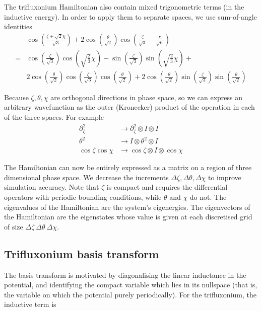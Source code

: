 \documentclass[11pt]{article}
\begin{document}
The trifluxonium Hamiltonian also contain mixed trigonometric terms (in the inductive energy). In order to apply them to separate spaces, we use sum-of-angle identities
\begin{align}
& \cos{\left(\frac{\zeta + \sqrt{2} \chi}{\sqrt{3}}\right)} + 2 \cos{\left(\frac{\theta}{\sqrt{2}}\right)} \cos{\left(\frac{\zeta}{\sqrt{3}} - \frac{\chi}{\sqrt{6}}\right)} \\
= 
& \cos{\left(\frac{\zeta}{\sqrt{3}}\right)} \cos{\left(\sqrt{\frac{2}{3}}\chi\right)} - \sin{\left(\frac{\zeta}{\sqrt{3}}\right)} \sin{\left(\sqrt{\frac{2}{3}}\chi\right)} + \\
& 2 \cos{\left(\frac{\theta}{\sqrt{2}}\right)} \cos{\left(\frac{\zeta}{\sqrt{3}}\right)} \cos{\left(\frac{\theta}{\sqrt{2}}\right)} + 2 \cos{\left(\frac{\theta}{\sqrt{2}}\right)} \sin{\left(\frac{\zeta}{\sqrt{3}}\right)} \sin{\left(\frac{\theta}{\sqrt{2}}\right)}
\end{align}


Because $\zeta, \theta, \chi$ are orthogonal directions in phase space, so we can express an arbitrary wavefunction as the outer (Kronecker) product of the operation in each of the three spaces. For example
\begin{align}
\partial_\zeta^2 &\rightarrow \partial_\zeta^2 \otimes I \otimes I \\
\theta^2 &\rightarrow I \otimes \theta^2 \otimes I \\
\cos{\zeta} \cos{\chi} &\rightarrow \cos{\zeta} \otimes I \otimes \cos{\chi}
\end{align}

The Hamiltonian can now be entirely expressed as a matrix on a region of three dimensional phase space. We decrease the increments $\Delta \zeta, \Delta \theta, \Delta \chi$ to improve simulation accuracy. Note that $\zeta$ is compact and requires the differential operators with periodic bounding conditions, while $\theta$ and $\chi$ do not. The eigenvalues of the Hamiltonian are the system's eigenergies. The eigenvectors of the Hamiltonian are the eigenstates whose value is given at each discretised grid of size $\Delta \zeta \ \Delta \theta \ \Delta \chi$.




\subsection{Trifluxonium basis transform}

The basis transform is motivated by diagonalising the linear inductance in the potential, and identifying the compact variable which lies in its nullspace (that is, the variable on which the potential purely periodically). For the trifluxonium, the inductive term is
\end{document}
